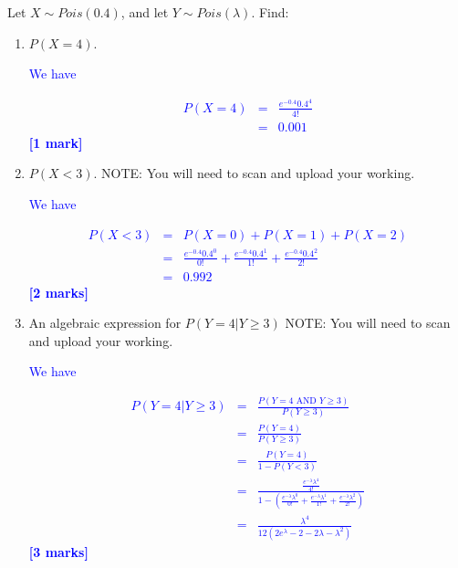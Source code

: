 \documentclass[11pt,a4paper]{article}
\begin{document}
\begin{question}
Let $X\sim Pois(0.4)$, and let $Y\sim Pois(\lambda)$. Find:
\begin{enumerate}
\item $P(X=4)$.

\textcolor{blue}{We have}

\textcolor{blue}{
\begin{eqnarray*}
P(X=4)&=&\frac{e^{-0.4}0.4^4}{4!}\\
&=&0.001
\end{eqnarray*}
}
\textcolor{blue}{\textbf{[1 mark]}}


\item $P(X<3)$. NOTE: You will need to scan and upload your working.

\textcolor{blue}{We have}

\textcolor{blue}{
\begin{eqnarray*}
P(X<3)&=&P(X=0)+P(X=1)+P(X=2)\\
&=&\frac{e^{-0.4}0.4^0}{0!}+\frac{e^{-0.4}0.4^1}{1!}+\frac{e^{-0.4}0.4^2}{2!}\\
&=&0.992
\end{eqnarray*}
}
\textcolor{blue}{\textbf{[2 marks]}}
\item An algebraic expression for $P(Y=4|Y\geq3)$ NOTE: You will need to scan and upload your working.

\textcolor{blue}{We have}

\textcolor{blue}{
\begin{eqnarray*}
P(Y=4|Y\geq3)&=&\frac{P(Y=4\textrm{ AND }Y\geq3)}{P(Y\geq3)}\\
&=&\frac{P(Y=4)}{P(Y\geq3)}\\
&=&\frac{P(Y=4)}{1-P(Y<3)}\\
&=&\frac{\frac{e^{-\lambda}\lambda^4}{4!}}{1-\left(\frac{e^{-\lambda}\lambda^0}{0!}+\frac{e^{-\lambda}\lambda^1}{1!}+\frac{e^{-\lambda}\lambda^2}{2!}\right)}\\
&=&\frac{\lambda^4}{12\left(2e^{\lambda}-2-2\lambda-\lambda^2\right)}
\end{eqnarray*}
}
\textcolor{blue}{\textbf{[3 marks]}}


\end{enumerate}

\end{question}
\end{document}
